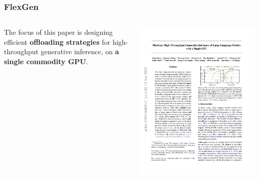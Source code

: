 \documentclass[12pt,aspectratio=169]{beamer}
\begin{document}
    \begin{frame}
        \frametitle{FlexGen}

        \begin{columns}
            \begin{column}{0.5\textwidth}
                The focus of this paper is designing efficient \textbf{offloading strategies} for high-throughput generative inference,
                on \textbf{a single commodity GPU}.
            \end{column}
            \begin{column}{0.5\textwidth}
                \centering
                \includegraphics[page=2,trim=207.56bp 368.48bp 319.13bp 353.49bp,clip,scale=1.2]{paper.pdf}
            \end{column}
        \end{columns}
    \end{frame}
\end{document}
